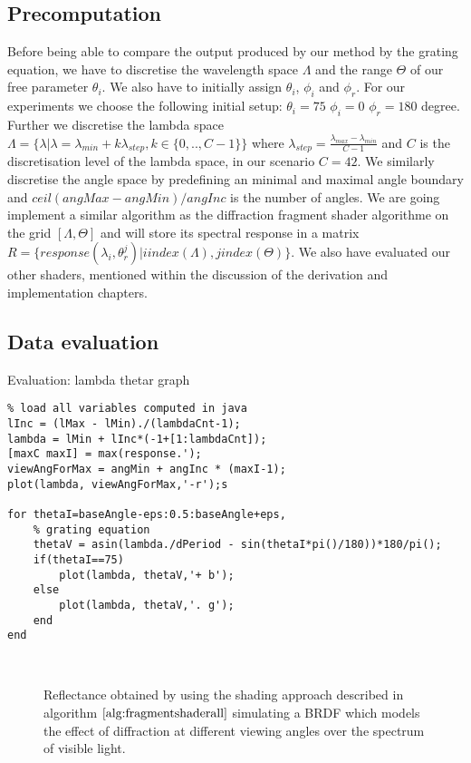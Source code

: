 \subsection{Precomputation}
Before being able to compare the output produced by our method by the grating equation, we have to discretise the wavelength space $\Lambda$ and the range $\Theta$ of our free parameter $\theta_i$. We also have to initially assign  $\theta_i$, $\phi_i$ and $\phi_r$. For our experiments we choose the following initial setup: $\theta_i = 75$ $\phi_i = 0$ $\phi_r = 180$ degree.
Further we discretise the lambda space $\Lambda = \{\lambda | \lambda = \lambda_{min} + k\lambda_{step}, k \in \{0,..,C-1\}\}$ where $\lambda_{step} = \frac{\lambda_{max}-\lambda_{min}}{C-1}$ and $C$ is the discretisation level of the lambda space, in our scenario $C = 42$. We similarly discretise the angle space by predefining an minimal and maximal angle boundary and $ceil(angMax - angMin) / angInc$ is the number of angles. 
We are going implement a similar algorithm as the diffraction fragment shader algorithme on the grid $[\Lambda, \Theta]$ and will store its spectral response in a matrix $R = \{response(\lambda_i, \theta_{r}^{j}) | i index(\Lambda), j index(\Theta)\}$. We also have evaluated our other shaders, mentioned within the discussion of the derivation and implementation chapters.

\subsection{Data evaluation}

\begin{algorithm}[H]
\caption{Evaluation: lambda thetar graph}
\label{alg:evalmatlab}
\begin{lstlisting}
% load all variables computed in java
lInc = (lMax - lMin)./(lambdaCnt-1);
lambda = lMin + lInc*(-1+[1:lambdaCnt]);
[maxC maxI] = max(response.');
viewAngForMax = angMin + angInc * (maxI-1);
plot(lambda, viewAngForMax,'-r');s

for thetaI=baseAngle-eps:0.5:baseAngle+eps,
	% grating equation
	thetaV = asin(lambda./dPeriod - sin(thetaI*pi()/180))*180/pi();
	if(thetaI==75)
		plot(lambda, thetaV,'+ b');
	else
		plot(lambda, thetaV,'. g');
	end
end

\end{lstlisting}
\end{algorithm}

\begin{figure}[H]
  \centering
~
~

  \caption{Reflectance obtained by using the shading approach described in algorithm $\ref{alg:fragmentshaderall}$ simulating a BRDF which models the effect of diffraction at different viewing angles over the spectrum of visible light.}

\label{fig:evaluationdiffshaderalllambda}
\end{figure}


